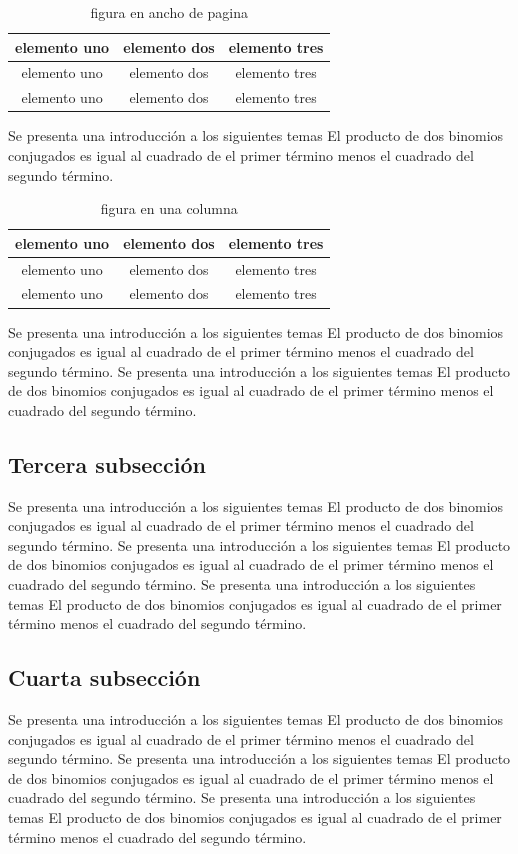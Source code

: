 \documentclass[12pt]{article}
\begin{document}
\begin{multicols}{2}
\begin{table}[ht]
\centering
\begin{tabular}{|c|c|c|}
\hline
elemento uno & elemento dos & elemento tres \\ \hline
elemento uno & elemento dos & elemento tres \\ \hline
elemento uno & elemento dos & elemento tres \\ \hline
\end{tabular}
\caption{figura en ancho de pagina}
\end{table}
Se presenta una introducción a los siguientes temas El producto de dos binomios conjugados es igual al cuadrado de el primer término menos el cuadrado del segundo término.
\begin{table}[H]
\centering
\begin{tabular}{|c|c|c|}
\hline
elemento uno & elemento dos & elemento tres \\ \hline
elemento uno & elemento dos & elemento tres \\ \hline
elemento uno & elemento dos & elemento tres \\ \hline
\end{tabular}
\caption{figura en una columna}
\end{table}
Se presenta una introducción a los siguientes temas El producto de dos binomios conjugados es igual al cuadrado de el primer término menos el cuadrado del segundo término.
Se presenta una introducción a los siguientes temas El producto de dos binomios conjugados es igual al cuadrado de el primer término menos el cuadrado del segundo término.
\subsection{Tercera subsección}
Se presenta una introducción a los siguientes temas El producto de dos binomios conjugados es igual al cuadrado de el primer término menos el cuadrado del segundo término.
Se presenta una introducción a los siguientes temas El producto de dos binomios conjugados es igual al cuadrado de el primer término menos el cuadrado del segundo término.
Se presenta una introducción a los siguientes temas El producto de dos binomios conjugados es igual al cuadrado de el primer término menos el cuadrado del segundo término.
\subsection{Cuarta subsección}
Se presenta una introducción a los siguientes temas El producto de dos binomios conjugados es igual al cuadrado de el primer término menos el cuadrado del segundo término.
Se presenta una introducción a los siguientes temas El producto de dos binomios conjugados es igual al cuadrado de el primer término menos el cuadrado del segundo término.
Se presenta una introducción a los siguientes temas El producto de dos binomios conjugados es igual al cuadrado de el primer término menos el cuadrado del segundo término.
\end{multicols}
\end{document}

